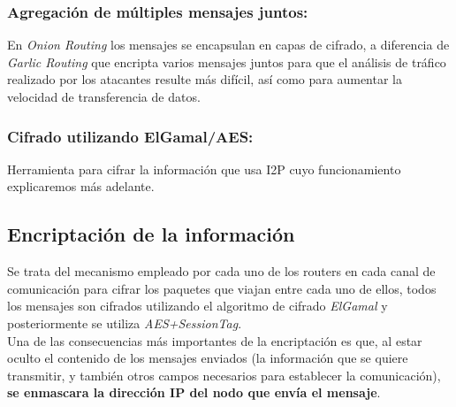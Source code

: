 \subsubsection*{Agregación de múltiples mensajes juntos:}
En \textit{Onion Routing} los mensajes se encapsulan en capas de cifrado, a diferencia de \textit{Garlic Routing} que encripta varios mensajes juntos para que el análisis de tráfico realizado por los atacantes resulte más difícil, así como para aumentar la velocidad de transferencia de datos.

\subsubsection*{Cifrado utilizando ElGamal/AES:}
Herramienta para cifrar la información que usa I2P cuyo funcionamiento explicaremos más adelante.




\subsection{Encriptación de la información}

Se trata del mecanismo empleado por cada uno de los routers en cada canal de comunicación para cifrar los paquetes que viajan entre cada uno de ellos, todos los mensajes son cifrados utilizando el algoritmo de cifrado \textit{ElGamal} y posteriormente se utiliza \textit{AES+SessionTag}.\\

Una de las consecuencias más importantes de la encriptación es que, al estar oculto el contenido de los mensajes enviados (la información que se quiere transmitir, y también otros campos necesarios para establecer la comunicación), \textbf{se enmascara la dirección IP del nodo que envía el mensaje}.


